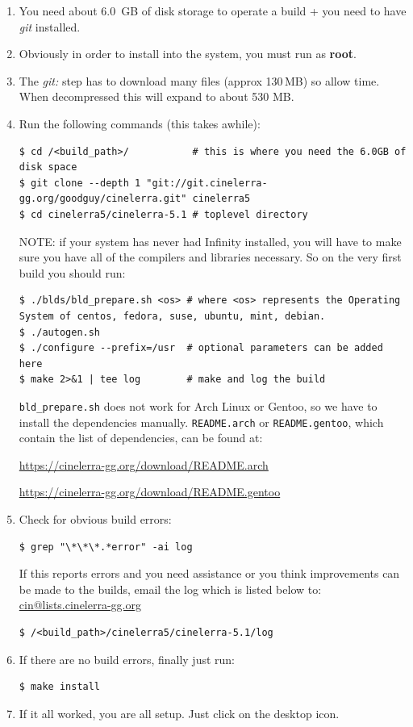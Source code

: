 \begin{enumerate}
    \item 
        You need about 6.0 \,GB of disk storage to operate a build + you need to have \textit{git} installed.
    \item  Obviously in order to install into the system, you must run as \textbf{root}.
    \item  The \textit{git:} step has to download many files (approx 130\,MB) so allow time.  When decompressed this will expand to about 530 MB.
    \item  Run the following commands (this takes awhile):

        \begin{lstlisting}[numbers=none]
$ cd /<build_path>/           # this is where you need the 6.0GB of disk space
$ git clone --depth 1 "git://git.cinelerra-gg.org/goodguy/cinelerra.git" cinelerra5 
$ cd cinelerra5/cinelerra-5.1 # toplevel directory
        \end{lstlisting}

        NOTE: if your system has never had \CGG{} Infinity installed, you will have to make sure you have all of the compilers and libraries necessary.  
        So on the very first build you should run:

        \begin{lstlisting}[numbers=none]
$ ./blds/bld_prepare.sh <os> # where <os> represents the Operating System of centos, fedora, suse, ubuntu, mint, debian.
$ ./autogen.sh
$ ./configure --prefix=/usr  # optional parameters can be added here
$ make 2>&1 | tee log        # make and log the build
        \end{lstlisting}
        \texttt{bld\_prepare.sh} does not work for Arch Linux or Gentoo, so we have to install the dependencies manually. \texttt{README.arch} or \texttt{README.gentoo}, which contain the list of dependencies, can be found at: \\ 
{\small \url{https://cinelerra-gg.org/download/README.arch}

	\url{https://cinelerra-gg.org/download/README.gentoo}}
    \item  Check for obvious build errors:
        \begin{lstlisting}[numbers=none]
$ grep "\*\*\*.*error" -ai log
        \end{lstlisting}
        If this reports errors and you need assistance or you think improvements can be made to the builds,
        email the log which is listed below to: \href{mailto:cin@lists.cinelerra-gg.org}{cin@lists.cinelerra-gg.org}
        \begin{lstlisting}[numbers=none]
$ /<build_path>/cinelerra5/cinelerra-5.1/log
        \end{lstlisting}
    \item  If there are no build errors, finally just run:
        \begin{lstlisting}[numbers=none]
   $ make install
        \end{lstlisting}
    \item  If it all worked, you are all setup. Just click on the \CGG{} desktop icon.
\end{enumerate}

